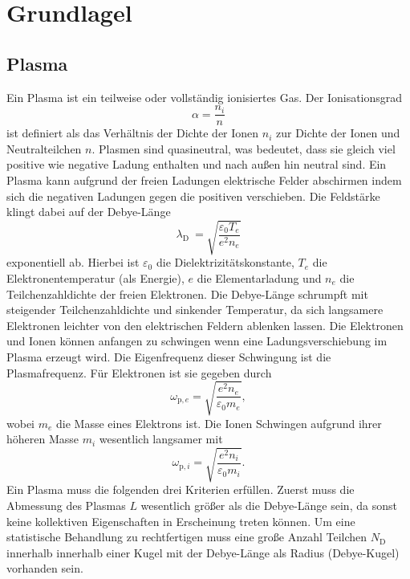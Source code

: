 \section{Grundlagel}

\subsection{Plasma}
Ein Plasma ist ein teilweise oder vollst\"andig ionisiertes Gas.
Der Ionisationsgrad
\begin{equation}
\alpha
    =\frac{n_i}{n}
    \label{eq:a}
\end{equation}
ist definiert als das Verh\"altnis der Dichte der Ionen $n_i$ zur Dichte der Ionen und Neutralteilchen $n$.
Plasmen sind quasineutral, was bedeutet, dass sie gleich viel positive wie negative Ladung enthalten und nach au\ss en hin neutral sind.
Ein Plasma kann aufgrund der freien Ladungen elektrische Felder abschirmen indem sich die negativen Ladungen gegen die positiven verschieben.
Die Feldst\"arke klingt dabei auf der Debye-L\"ange
\begin{equation}
\lambda_\text{D}\
    =\sqrt{\frac{\varepsilon_0 T_e}{e^2n_e}}
    \label{eq:lD}
\end{equation}
exponentiell ab.
Hierbei ist $\varepsilon_0$ die Dielektrizit\"atskonstante, $T_e$ die Elektronentemperatur (als Energie), $e$ die Elementarladung und $n_e$ die Teilchenzahldichte der freien Elektronen.
Die Debye-L\"ange schrumpft mit steigender Teilchenzahldichte und sinkender Temperatur, da sich langsamere Elektronen leichter von den elektrischen Feldern ablenken lassen.
Die Elektronen und Ionen k\"onnen anfangen zu schwingen wenn eine Ladungsverschiebung im Plasma erzeugt wird.
Die Eigenfrequenz dieser Schwingung ist die Plasmafrequenz.
F\"ur Elektronen ist sie gegeben durch
\begin{equation}
\omega_{\text{p},e}
    =\sqrt{\frac{e^2n_e}{\varepsilon_0m_e}},
    \label{eq:wpe}
\end{equation}
wobei $m_e$ die Masse eines Elektrons ist.
Die Ionen Schwingen aufgrund ihrer h\"oheren Masse $m_i$ wesentlich langsamer mit
\begin{equation}
\omega_{\text{p},i}
    =\sqrt{\frac{e^2n_i}{\varepsilon_0m_i}}.
    \label{eq:wpi}
\end{equation}
Ein Plasma muss die folgenden drei Kriterien erf\"ullen.
Zuerst muss die Abmessung des Plasmas $L$ wesentlich gr\"o\ss er als die Debye-L\"ange sein, da sonst keine kollektiven Eigenschaften in Erscheinung treten k\"onnen.
Um eine statistische Behandlung zu rechtfertigen muss eine gro\ss e Anzahl Teilchen $N_\text{D}$ innerhalb innerhalb einer Kugel mit der Debye-L\"ange als Radius (Debye-Kugel) vorhanden sein.
